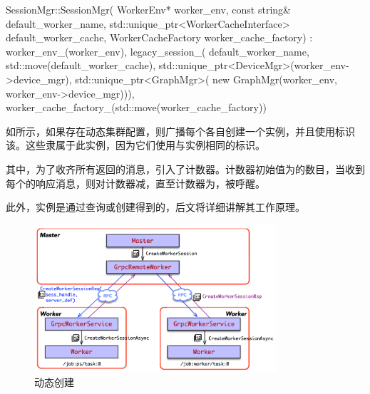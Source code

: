 \begin{content}
\begin{leftbar}
\begin{c++}
SessionMgr::SessionMgr(
    WorkerEnv* worker_env, 
    const string& default_worker_name,
    std::unique_ptr<WorkerCacheInterface> default_worker_cache,
    WorkerCacheFactory worker_cache_factory)
    : worker_env_(worker_env),
      legacy_session_(
          default_worker_name, 
          std::move(default_worker_cache),
          std::unique_ptr<DeviceMgr>(worker_env->device_mgr),
          std::unique_ptr<GraphMgr>(
              new GraphMgr(worker_env, 
              worker_env->device_mgr))),
      worker_cache_factory_(std::move(worker_cache_factory)) {}
\end{c++}
\end{leftbar}

如所示，如果存在动态集群配置，则广播每个各自创建一个实例，并且使用标识该。这些隶属于此实例，因为它们使用与实例相同的标识。

其中，为了收齐所有返回的消息，引入了计数器。计数器初始值为的数目，当收到每个的响应消息，则对计数器减，直至计数器为，被呼醒。

此外，实例是通过查询或创建得到的，后文将详细讲解其工作原理。

\begin{figure}[H]
\centering
\includegraphics[width=0.8\textwidth]{figures/dist-create-worker-session.png}
\caption{动态创建}
 \label{fig:dist-create-worker-session}
\end{figure}


\end{content}
